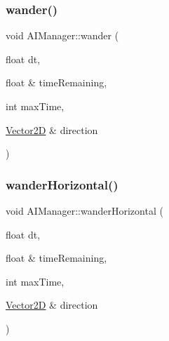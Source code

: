 \hypertarget{class_a_i_manager_affdb0ecab44ebf429f5d8a3f08051416}{}\label{class_a_i_manager_affdb0ecab44ebf429f5d8a3f08051416} 
\subsubsection{\texorpdfstring{wander()}{wander()}}
{\footnotesize\ttfamily void A\+I\+Manager\+::wander (\begin{DoxyParamCaption}\item[{float}]{dt,  }\item[{float \&}]{time\+Remaining,  }\item[{int}]{max\+Time,  }\item[{\hyperlink{class_vector2_d}{Vector2D} \&}]{direction }\end{DoxyParamCaption})\hspace{0.3cm}{\ttfamily [static]}}

\hypertarget{class_a_i_manager_a130f5f0727fd01841265946e533de685}{}\label{class_a_i_manager_a130f5f0727fd01841265946e533de685} 
\subsubsection{\texorpdfstring{wander\+Horizontal()}{wanderHorizontal()}}
{\footnotesize\ttfamily void A\+I\+Manager\+::wander\+Horizontal (\begin{DoxyParamCaption}\item[{float}]{dt,  }\item[{float \&}]{time\+Remaining,  }\item[{int}]{max\+Time,  }\item[{\hyperlink{class_vector2_d}{Vector2D} \&}]{direction }\end{DoxyParamCaption})\hspace{0.3cm}{\ttfamily [static]}}

\hypertarget{class_a_i_manager_adac775408b1f5657948ac68876633ad6}{}\label{class_a_i_manager_adac775408b1f5657948ac68876633ad6} 
